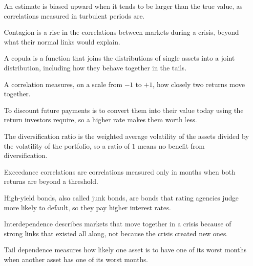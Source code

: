 \begin{keyterms}
\footnotesize
\begin{description}[leftmargin=0pt, itemsep=0pt, parsep=0pt, topsep=0pt, font=\normalfont\bfseries\color{FEMaroon}]
  \item[Biased upward.] An estimate is biased upward when it tends to be larger than the true value, as correlations measured in turbulent periods are.
  \item[Contagion.] Contagion is a rise in the correlations between markets during a crisis, beyond what their normal links would explain.
  \item[Copula.] A copula is a function that joins the distributions of single assets into a joint distribution, including how they behave together in the tails.
  \item[Correlation.] A correlation measures, on a scale from $-1$ to $+1$, how closely two returns move together.
  \item[Discount.] To discount future payments is to convert them into their value today using the return investors require, so a higher rate makes them worth less.
  \item[Diversification ratio.] The diversification ratio is the weighted average volatility of the assets divided by the volatility of the portfolio, so a ratio of 1 means no benefit from diversification.
  \item[Exceedance correlations.] Exceedance correlations are correlations measured only in months when both returns are beyond a threshold.
  \item[High-yield bonds.] High-yield bonds, also called junk bonds, are bonds that rating agencies judge more likely to default, so they pay higher interest rates.
  \item[Interdependence.] Interdependence describes markets that move together in a crisis because of strong links that existed all along, not because the crisis created new ones.
  \item[Tail dependence.] Tail dependence measures how likely one asset is to have one of its worst months when another asset has one of its worst months.
\end{description}
\end{keyterms}
